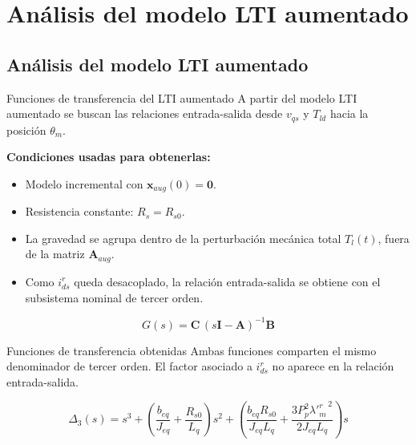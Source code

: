 \documentclass[aspectratio=169,t]{beamer}
\newcommand{\SecPresentacion}{Presentación del problema}
\newcommand{\SecMecanico}{Subsistema mecánico equivalente}
\newcommand{\SecElectromagnetico}{Subsistema electromagnético en coordenadas qd0}
\newcommand{\SecTermico}{Subsistema térmico}
\newcommand{\SecNLGlobal}{Sistema No Lineal Global}
\newcommand{\SecLPV}{Linealización Jacobiana (LPV)}
\newcommand{\SecLTI}{Obtención del modelo LTI equivalente}
\newcommand{\SecAnalisisLTI}{Análisis del modelo LTI aumentado}
\newcommand{\SecDinamica}{Respuesta dinámica en dominio del tiempo}
\newcommand{\SecControlador}{Diseño y análisis del controlador en cascada}
\newcommand{\SecVerifSpecs}{Verificación de desempeño: Especificaciones de operación}
\newcommand{\SecVerifOffset}{Verificación de desempeño: Offset de estado estacionario}
\newcommand{\SecVerifNoIdealidades}{Verificación de desempeño: No idealidades y comportamiento térmico}
\newcommand{\SecDiscretizacion}{Discretización del controlador}
\newcommand{\SecSoftware}{Codificación del software de control}
\newcommand{\AgendaItem}[3]{%
  \ifnum#1=#2
    {\scriptsize\bfseries\color{uncBlue}%
      \hyperlink{sec:#1}{\makebox[2.2em][r]{#1.}\hspace{0.7em}%
      \parbox[t]{0.86\textwidth}{#3}}\par}%
  \else
    {\scriptsize\color{black!26}%
      \hyperlink{sec:#1}{\makebox[2.2em][r]{#1.}\hspace{0.7em}%
      \parbox[t]{0.86\textwidth}{#3}}\par}%
  \fi
  \vspace{0.35mm}%
}
\newcommand{\AgendaBody}[1]{%
    \vspace{3mm}
    {\Large\bfseries\color{uncBlue}Tabla de contenidos\par}
    \vspace{2mm}
    \begin{minipage}{0.94\textwidth}
      \AgendaItem{1}{#1}{\SecPresentacion}
      \AgendaItem{2}{#1}{\SecMecanico}
      \AgendaItem{3}{#1}{\SecElectromagnetico}
      \AgendaItem{4}{#1}{\SecTermico}
      \AgendaItem{5}{#1}\SecNLGlobal
      \AgendaItem{6}{#1}{\SecLPV}
      \AgendaItem{7}{#1}{\SecLTI}
      \AgendaItem{8}{#1}{\SecAnalisisLTI}
      \AgendaItem{9}{#1}{\SecDinamica}
      \AgendaItem{10}{#1}{\SecControlador}
      \AgendaItem{11}{#1}{\SecVerifSpecs}
      \AgendaItem{12}{#1}{\SecVerifOffset}
      \AgendaItem{13}{#1}{\SecVerifNoIdealidades}
      \AgendaItem{14}{#1}{\SecDiscretizacion}
      \AgendaItem{15}{#1}{\SecSoftware}
    \end{minipage}
    \vfill
}
\newcommand{\AgendaSlideTarget}[2]{%
  \begin{frame}[plain]
    \hypertarget{#2}{}%
    \AgendaBody{#1}
  \end{frame}
}
\newcommand{\StartProjectSection}[2]{%
  \section{#2}%
  \subsection{#2}%
  \AgendaSlideTarget{#1}{sec:#1}%
}
\begin{document}
\StartProjectSection{8}{\SecAnalisisLTI}
\begin{frame}{Funciones de transferencia del LTI aumentado}
{\small\color{uncGray}A partir del modelo LTI aumentado se buscan las relaciones entrada-salida desde $v_{qs}$ y $T_{ld}$ hacia la posición $\theta_m$.}\par
\vspace{3mm}

\textbf{Condiciones usadas para obtenerlas:}
\begin{itemize}
  \item Modelo incremental con $\bm{x}_{aug}(0)=\bm{0}$.
  \item Resistencia constante: $R_s=R_{s0}$.
  \item La gravedad se agrupa dentro de la perturbación mecánica total $T_l(t)$, fuera de la matriz $\bm{A}_{aug}$.
  \item Como $i_{ds}^{r}$ queda desacoplado, la relación entrada-salida se obtiene con el subsistema nominal de tercer orden.
\end{itemize}

\begin{equation*}
G(s)=\bm{C}\,(s\bm{I}-\bm{A})^{-1}\bm{B}
\end{equation*}
\end{frame}

\begin{frame}{Funciones de transferencia obtenidas}
{\small\color{uncGray}Ambas funciones comparten el mismo denominador de tercer orden. El factor asociado a $i_{ds}^{r}$ no aparece en la relación entrada-salida.}\par
\vspace{2mm}

\small
\begin{equation*}
\Delta_3(s)=
s^3+
\left(\frac{b_{eq}}{J_{eq}}+\frac{R_{s0}}{L_q}\right)s^2+
\left(\frac{b_{eq}R_{s0}}{J_{eq}L_q}+
\frac{3P_p^2{\lambda'^r_m}^{\,2}}{2J_{eq}L_q}\right)s
\end{equation*}

\vspace{2mm}
\normalsize


\end{frame}
\end{document}

